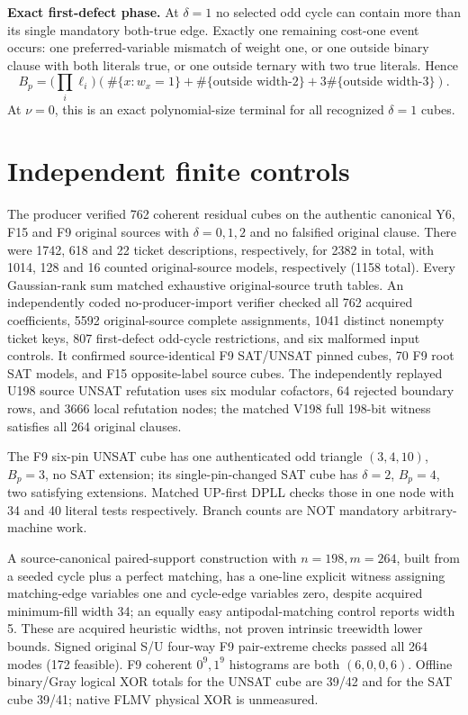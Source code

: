 \documentclass[11pt]{article}
\begin{document}
\noindent\textbf{Exact first-defect phase.} At $\delta=1$ no selected odd cycle can contain more than its single mandatory both-true edge. Exactly one remaining cost-one event occurs: one preferred-variable mismatch of weight one, or one outside binary clause with both literals true, or one outside ternary with two true literals. Hence
\[
B_p=\bigl(\prod_i\ell_i\bigr)
(\#\{x:w_x=1\}+\#\{\text{outside width-2}\}
+3\#\{\text{outside width-3}\}).
\]
At $\nu=0$, this is an exact polynomial-size terminal for all recognized $\delta=1$ cubes.
\section{Independent finite controls}
The producer verified 762 coherent residual cubes on the authentic canonical Y6, F15 and F9 original sources with $\delta=0,1,2$ and no falsified original clause. There were 1742, 618 and 22 ticket descriptions, respectively, for 2382 in total, with 1014, 128 and 16 counted original-source models, respectively (1158 total). Every Gaussian-rank sum matched exhaustive original-source truth tables. An independently coded no-producer-import verifier checked all 762 acquired coefficients, 5592 original-source complete assignments, 1041 distinct nonempty ticket keys, 807 first-defect odd-cycle restrictions, and six malformed input controls. It confirmed source-identical F9 SAT/UNSAT pinned cubes, 70 F9 root SAT models, and F15 opposite-label source cubes. The independently replayed U198 source UNSAT refutation uses six modular cofactors, 64 rejected boundary rows, and 3666 local refutation nodes; the matched V198 full 198-bit witness satisfies all 264 original clauses.
\par\noindent The F9 six-pin UNSAT cube has one authenticated odd triangle $(3,4,10)$, $B_p=3$, no SAT extension; its single-pin-changed SAT cube has $\delta=2$, $B_p=4$, two satisfying extensions. Matched UP-first DPLL checks those in one node with 34 and 40 literal tests respectively. Branch counts are NOT mandatory arbitrary-machine work.
\par\noindent A source-canonical paired-support construction with $n=198,m=264$, built from a seeded cycle plus a perfect matching, has a one-line explicit witness assigning matching-edge variables one and cycle-edge variables zero, despite acquired minimum-fill width 34; an equally easy antipodal-matching control reports width 5. These are acquired heuristic widths, not proven intrinsic treewidth lower bounds. Signed original S/U four-way F9 pair-extreme checks passed all 264 modes (172 feasible). F9 coherent $0^9,1^9$ histograms are both $(6,0,0,6)$. Offline binary/Gray logical XOR totals for the UNSAT cube are 39/42 and for the SAT cube 39/41; native FLMV physical XOR is unmeasured.
\end{document}
